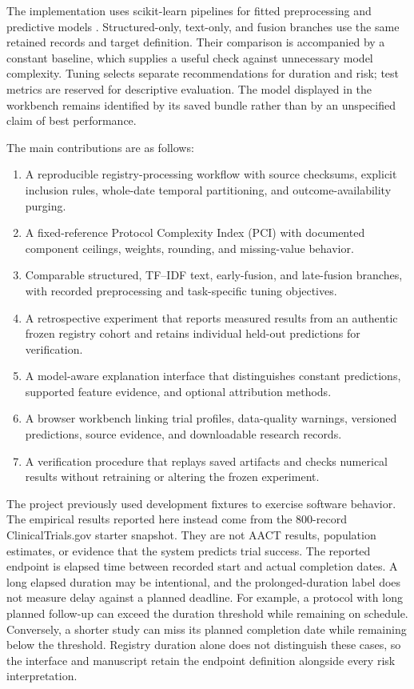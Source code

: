 \documentclass[10pt,letterpaper,twocolumn]{article}
\begin{document}
The implementation uses scikit-learn pipelines for fitted preprocessing and predictive models \cite{sklearn}. Structured-only, text-only, and fusion branches use the same retained records and target definition. Their comparison is accompanied by a constant baseline, which supplies a useful check against unnecessary model complexity. Tuning selects separate recommendations for duration and risk; test metrics are reserved for descriptive evaluation. The model displayed in the workbench remains identified by its saved bundle rather than by an unspecified claim of best performance.

The main contributions are as follows:
\begin{enumerate}
\item A reproducible registry-processing workflow with source checksums, explicit inclusion rules, whole-date temporal partitioning, and outcome-availability purging.
\item A fixed-reference Protocol Complexity Index (PCI) with documented component ceilings, weights, rounding, and missing-value behavior.
\item Comparable structured, TF--IDF text, early-fusion, and late-fusion branches, with recorded preprocessing and task-specific tuning objectives.
\item A retrospective experiment that reports measured results from an authentic frozen registry cohort and retains individual held-out predictions for verification.
\item A model-aware explanation interface that distinguishes constant predictions, supported feature evidence, and optional attribution methods.
\item A browser workbench linking trial profiles, data-quality warnings, versioned predictions, source evidence, and downloadable research records.
\item A verification procedure that replays saved artifacts and checks numerical results without retraining or altering the frozen experiment.
\end{enumerate}

The project previously used development fixtures to exercise software behavior. The empirical results reported here instead come from the 800-record ClinicalTrials.gov starter snapshot. They are not AACT results, population estimates, or evidence that the system predicts trial success. The reported endpoint is elapsed time between recorded start and actual completion dates. A long elapsed duration may be intentional, and the prolonged-duration label does not measure delay against a planned deadline. For example, a protocol with long planned follow-up can exceed the duration threshold while remaining on schedule. Conversely, a shorter study can miss its planned completion date while remaining below the threshold. Registry duration alone does not distinguish these cases, so the interface and manuscript retain the endpoint definition alongside every risk interpretation.
\end{document}
